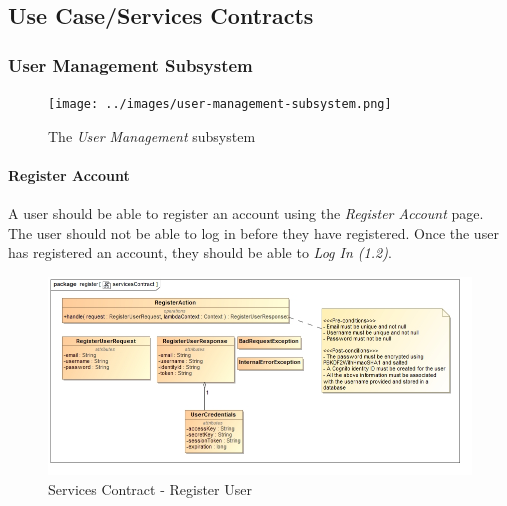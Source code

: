 \documentclass{article}
\let\cleardoublepage\clearpage
\begin{document}
\cleardoublepage

	\subsection{Use Case/Services Contracts}
		\subsubsection{User Management Subsystem}
			\begin{figure}[H]
				\centering
				\texttt{[image: ../images/user-management-subsystem.png]}
				\caption{The \emph{User Management} subsystem}
			\end{figure}
		\paragraph{Register Account}
			A user should be able to register an account using the \emph{Register Account} page. The user should not be able to log in before they have registered. Once the user has registered an account, they should be able to \emph{Log In (1.2)}.
			\begin{figure}[H]
				\includegraphics[width=\linewidth]{../images/ServicesContracts/register.jpg}
				\caption{Services Contract - Register User}
			\end{figure}
			
\cleardoublepage
\end{document}
